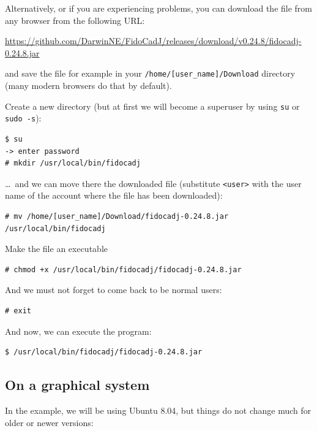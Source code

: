 \documentclass[10pt,a4paper,twoside]{scrreprt}
\begin{document}
Alternatively, or if you are experiencing problems, you can download the file from any browser from the following URL:

{\small
\href{https://github.com/DarwinNE/FidoCadJ/releases/download/v0.24.8/fidocadj-0.24.8.jar}{https://github.com/DarwinNE/FidoCadJ/releases/download/v0.24.8/fidocadj-0.24.8.jar}}

and save the file for example in your \lstinline!/home/[user_name]/Download! directory (many modern browsers do that by default).

Create a new directory (but at first we will become a superuser by using \lstinline!su! or \lstinline!sudo -s!):

\begin{lstlisting}
$ su
-> enter password
# mkdir /usr/local/bin/fidocadj
\end{lstlisting}

\dots\ and we can move there the downloaded file (substitute \lstinline!<user>! with the user name of the account where the file has been downloaded):

\begin{lstlisting}
# mv /home/[user_name]/Download/fidocadj-0.24.8.jar /usr/local/bin/fidocadj
\end{lstlisting}

Make the file an executable

\begin{lstlisting}
# chmod +x /usr/local/bin/fidocadj/fidocadj-0.24.8.jar
\end{lstlisting}

And we must not forget to come back to be normal users:

\begin{lstlisting}
# exit
\end{lstlisting}

And now, we can execute the program:

\begin{lstlisting}
$ /usr/local/bin/fidocadj/fidocadj-0.24.8.jar
\end{lstlisting}

\subsection{On a graphical system}
\label{inst_grafica}
In the example, we will be using Ubuntu 8.04, but things do not change much for older or newer versions:
\end{document}
